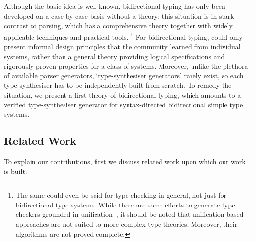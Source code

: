 
Although the basic idea is well known, bidirectional typing has only been developed on a case-by-case basis without a theory; this situation is in stark contrast to parsing, which has a comprehensive theory together with widely applicable techniques and practical tools.%
\footnote{The same could even be said for type checking in general, not just for bidirectional type systems.
While there are some efforts to generate type checkers grounded in unification~\citep{Gast2004,Grewe2015}, it should be noted that unification-based approaches are not suited to more complex type theories.
Moreover, their algorithms are not proved complete.}
For bidirectional typing, \citet{Dunfield2021} could only present informal design principles that the community learned from individual systems, rather than a general theory providing logical specifications and rigorously proven properties for a class of systems.
Moreover, unlike the plethora of available parser generators, `type-synthesiser generators' rarely exist, so each type synthesiser has to be independently built from scratch.
To remedy the situation, we present a first theory of bidirectional typing, which amounts to a verified type-synthesiser generator for syntax-directed bidirectional simple type systems.

\subsection{Related Work}\label{sec:related-work}

To explain our contributions, first we discuss related work upon which our work is built.


